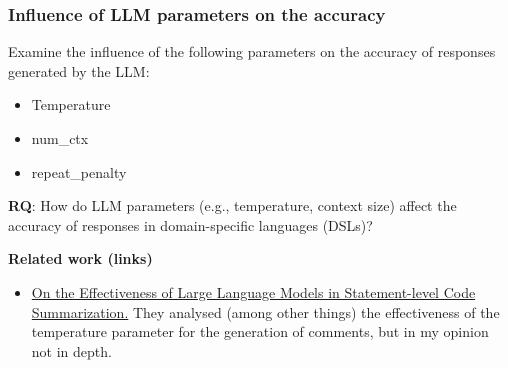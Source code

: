 \subsubsection{Influence of LLM parameters on the accuracy}
Examine the influence of the following parameters on the accuracy of responses generated by the LLM:

\begin{itemize}
    \item Temperature
    \item num\_ctx
    \item repeat\_penalty
\end{itemize}

\textbf{RQ}: How do LLM parameters (e.g., temperature, context size) affect the accuracy of responses in domain-specific languages (DSLs)?

\textbf{Related work (links)}
\begin{itemize}
    \item \href{https://ieeexplore.ieee.org/document/10684656}{On the Effectiveness of Large Language Models in Statement-level Code Summarization.} They analysed (among other things) the effectiveness of the temperature parameter for the generation of comments, but in my opinion not in depth.
\end{itemize}
